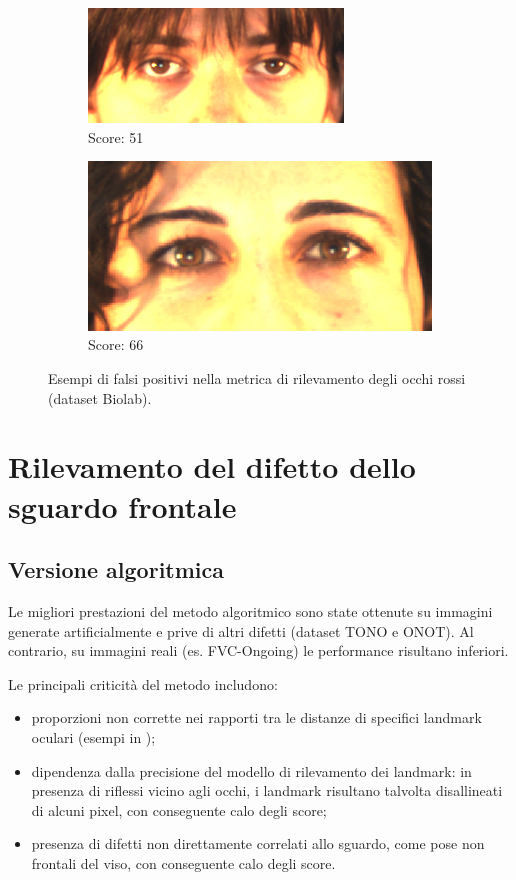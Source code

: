 \documentclass[12pt,a4paper,openright,twoside]{book}
\begin{document}
\begin{figure}[htbp]
    \centering
    \begin{subfigure}{0.49\textwidth}
        \centering
        \includegraphics[width=.7\linewidth]{figures/red_eye_false_negative_image_1.png}
        \caption{Score: 51}
    \end{subfigure}
    \hfill
    \begin{subfigure}{0.49\textwidth}
        \centering
        \includegraphics[width=.7\linewidth]{figures/red_eye_false_negative_image_2.png}
        \caption{Score: 66}
    \end{subfigure}
    \caption{Esempi di falsi positivi nella metrica di rilevamento degli occhi rossi (dataset Biolab).}
    \label{fig:red_eye_false_negative_images}
\end{figure}

\section{Rilevamento del difetto dello sguardo frontale}

\subsection{Versione algoritmica}
Le migliori prestazioni del metodo algoritmico sono state ottenute su immagini generate artificialmente e prive di altri difetti (dataset TONO e ONOT). Al contrario, su immagini reali (es. FVC-Ongoing) le performance risultano inferiori.  

Le principali criticità del metodo includono:
\begin{itemize}
    \item proporzioni non corrette nei rapporti tra le distanze di specifici landmark oculari (esempi in );
    \item dipendenza dalla precisione del modello di rilevamento dei landmark: in presenza di riflessi vicino agli occhi, i landmark risultano talvolta disallineati di alcuni pixel, con conseguente calo degli score;
    \item presenza di difetti non direttamente correlati allo sguardo, come pose non frontali del viso, con conseguente calo degli score.
\end{itemize}
\end{document}
